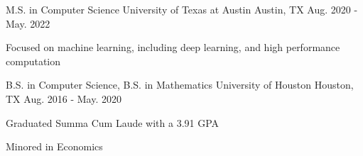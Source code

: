 

\begin{cventries}

  \cventry
    {M.S. in Computer Science} %
    {University of Texas at Austin} %
    {Austin, TX} %
    {Aug. 2020 - May. 2022} %
    {
      \begin{cvitems} %
        \item {Focused on machine learning, including deep learning, and high performance computation}
      \end{cvitems}
    }
   \cventry
    {B.S. in Computer Science, B.S. in Mathematics} %
    {University of Houston} %
    {Houston, TX} %
    {Aug. 2016 - May. 2020} %
    {
      \begin{cvitems} %
        \item {Graduated Summa Cum Laude with a 3.91 GPA}
        \item {Minored in Economics}
      \end{cvitems}
    }

\end{cventries}
